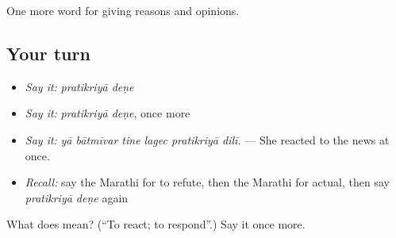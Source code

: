 \begin{grammarlens}[title={What you've built}]
One more word for giving reasons and opinions.
\end{grammarlens}

\subsection*{Your turn}
\begin{itemize}
\raggedright
  \item \emph{Say it:} \emph{pratikriyā deṇe}
  \item \emph{Say it:} \emph{pratikriyā deṇe}, once more
  \item \emph{Say it:} \emph{yā bātmīvar tine lagec pratikriyā dilī.} — She reacted to the news at once.
  \item \emph{Recall:} say the Marathi for to refute, then the Marathi for actual, then say \emph{pratikriyā deṇe} again
\end{itemize}

\begin{tcolorbox}[breakable,colback=teal!4,colframe=teal!35!black,title={Before you move on}]
What does   mean? (\textquotedblleft{}To react; to respond\textquotedblright{}.) Say it once more.
\end{tcolorbox}
